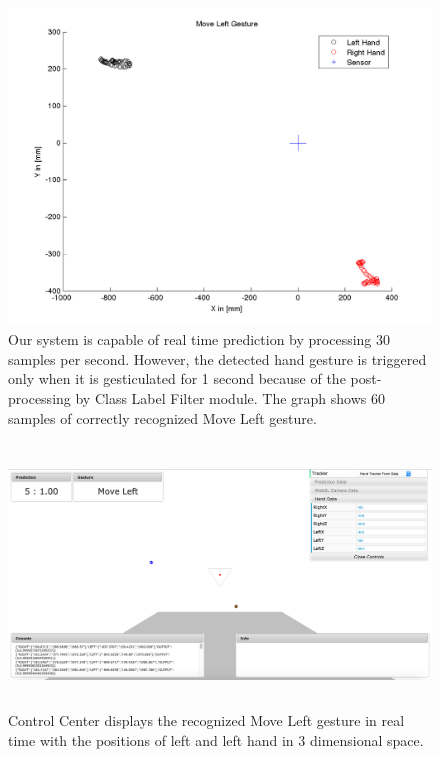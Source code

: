 \begin{figure}
	[h] \hspace{-15 mm} \centering 
	\includegraphics[width=155mm]{figures/result/test-move-left.jpg} \caption{Our system is capable of real time prediction by processing 30 samples per second. However, the detected hand gesture is triggered only when it is gesticulated for 1 second because of the post-processing by Class Label Filter module. The graph shows 60 samples of correctly recognized Move Left gesture. } \label{res:pl:move:left} 
\end{figure}
\begin{figure}
	[h] \centering 
	\includegraphics[height=70mm]{figures/result/cc-move-left.jpg} \caption{Control Center displays the recognized Move Left gesture in real time with the positions of left and left hand in 3 dimensional space.} \label{res:cc:move:left} 
\end{figure}
